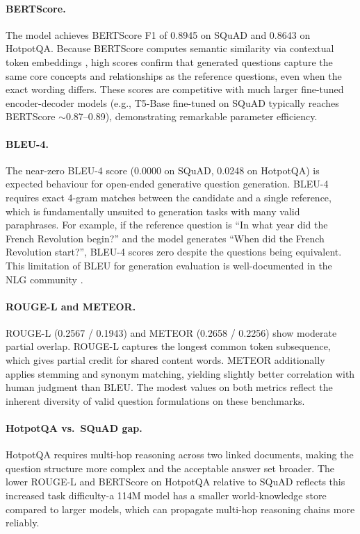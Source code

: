 \documentclass[12pt]{article}
\begin{document}
\paragraph{BERTScore.} The model achieves BERTScore F1 of 0.8945 on SQuAD and 0.8643 on HotpotQA. Because BERTScore computes semantic similarity via contextual token embeddings \citep{zhang2020bertscore}, high scores confirm that generated questions capture the same core concepts and relationships as the reference questions, even when the exact wording differs. These scores are competitive with much larger fine-tuned encoder-decoder models (e.g., T5-Base fine-tuned on SQuAD typically reaches BERTScore $\sim$0.87--0.89), demonstrating remarkable parameter efficiency.

\paragraph{BLEU-4.} The near-zero BLEU-4 score (0.0000 on SQuAD, 0.0248 on HotpotQA) is expected behaviour for open-ended generative question generation. BLEU-4 requires exact 4-gram matches between the candidate and a single reference, which is fundamentally unsuited to generation tasks with many valid paraphrases. For example, if the reference question is ``In what year did the French Revolution begin?'' and the model generates ``When did the French Revolution start?'', BLEU-4 scores zero despite the questions being equivalent. This limitation of BLEU for generation evaluation is well-documented in the NLG community \citep{zhang2020bertscore}.

\paragraph{ROUGE-L and METEOR.} ROUGE-L (0.2567 / 0.1943) and METEOR (0.2658 / 0.2256) show moderate partial overlap. ROUGE-L captures the longest common token subsequence, which gives partial credit for shared content words. METEOR additionally applies stemming and synonym matching, yielding slightly better correlation with human judgment than BLEU. The modest values on both metrics reflect the inherent diversity of valid question formulations on these benchmarks.

\paragraph{HotpotQA vs.\ SQuAD gap.} HotpotQA requires multi-hop reasoning across two linked documents, making the question structure more complex and the acceptable answer set broader. The lower ROUGE-L and BERTScore on HotpotQA relative to SQuAD reflects this increased task difficulty-a 114M model has a smaller world-knowledge store compared to larger models, which can propagate multi-hop reasoning chains more reliably.
\end{document}
